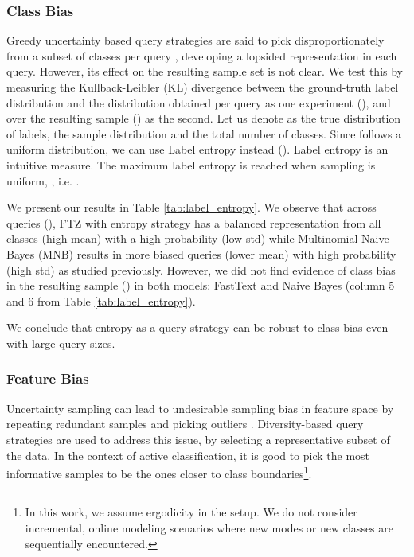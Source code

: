 \documentclass[11pt,a4paper]{article}
\begin{document}
\subsubsection{Class Bias}
Greedy uncertainty based query strategies are said to pick disproportionately from a subset of classes per query \cite{sener2018active, ebert2012ralf}, developing a lopsided representation in each query. However, its effect on the resulting sample set is not clear. We test this by measuring the Kullback-Leibler (KL) divergence between the ground-truth label distribution and the distribution obtained per query as one experiment (), and over the resulting sample () as the second. Let us denote  as the true distribution of labels,  the sample distribution and  the total number of classes. Since  follows a uniform distribution, we can use Label entropy instead (). Label entropy  is an intuitive measure. The maximum label entropy is reached when sampling is uniform, , i.e. .



We present our results in Table \ref{tab:label_entropy}. We observe that across queries (), FTZ with entropy strategy has a balanced representation from all classes (high mean) with a high probability (low std) while Multinomial Naive Bayes (MNB) results in more biased queries (lower mean) with high probability (high std) as studied previously.
However, we did not find evidence of class bias in the resulting sample () in both models: FastText and Naive Bayes (column 5 and 6 from Table \ref{tab:label_entropy}). 

We conclude that entropy as a query strategy can be robust to class bias even with large query sizes. 

\subsubsection{Feature Bias}
Uncertainty sampling can lead to undesirable sampling bias in feature space \cite{settles2009active} by repeating redundant samples and picking outliers \cite{zhu2008active}. Diversity-based query strategies \cite{sener2018active} are used to address this issue, by selecting a representative subset of the data. In the context of active classification, it is good to pick the most informative samples to be the ones closer to class boundaries\footnote{In this work, we assume ergodicity in the setup. We do not consider incremental, online modeling scenarios where new modes or new classes are sequentially encountered.}. 
\end{document}
